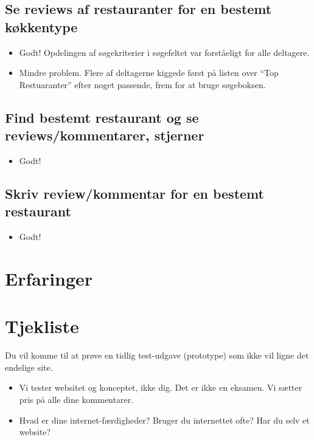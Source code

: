 \documentclass[a4paper, 12pt]{article}
\begin{document}
\subsection{Se reviews af restauranter for en bestemt køkkentype}
\begin{itemize}
\item Godt! Opdelingen af søgekriterier i søgefeltet var forståeligt for alle deltagere.
\item Mindre problem. Flere af deltagerne kiggede først på listen over ``Top Restuaranter'' efter noget passende, frem for at bruge søgeboksen. 
\end{itemize}

\subsection{Find bestemt restaurant og se reviews/kommentarer, stjerner}
\begin{itemize}
\item Godt! 
\end{itemize}

\subsection{Skriv review/kommentar for en bestemt restaurant}
\begin{itemize}
\item Godt! 
\end{itemize}


\section{Erfaringer}
\label{sec:Erfaringer}

\clearpage
\appendix

\section{Tjekliste}

Du vil komme til at prøve en tidlig test-udgave (prototype) som ikke vil ligne
det endelige site.
\begin{itemize}
\item Vi tester websitet og konceptet, ikke dig. Det er ikke en
  eksamen. Vi sætter pris på alle dine kommentarer.
\item Hvad er dine internet-færdigheder? Bruger du internettet ofte?
  Har du selv et website?
\end{itemize}
\end{document}
